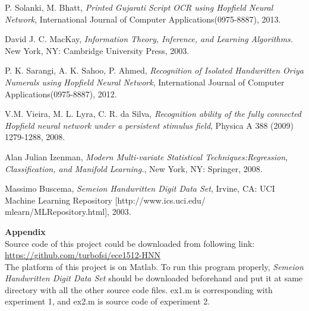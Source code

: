 \begin{thebibliography}{1}
P. Solanki, M. Bhatt, \emph{Printed Gujarati Script OCR using Hopfield Neural Network}, International Journal of Computer Applications(0975-8887), 2013.

David J. C. MacKay, \emph{Information Theory, Inference, and Learning Algorithms.} New York, NY: Cambridge University Press, 2003.

P. K. Sarangi, A. K. Sahoo, P. Ahmed, \emph{Recognition of Isolated Handwritten Oriya Numerals using Hopfield Neural Network}, International Journal of Computer Applications(0975-8887), 2012.

V.M. Vieira, M. L. Lyra, C. R. da Silva, \emph{Recognition ability of the fully connected Hopfield neural network under a persistent stimulus field}, Physica A 388 (2009) 1279-1288, 2008.

Alan Julian Izenman, \emph{Modern Multi-variate Statistical Techniques:Regression, Classification, and Manifold Learning.}, New York, NY: Springer, 2008.

Massimo Buscema, \emph{Semeion Handwritten Digit Data Set}, Irvine, CA: UCI Machine Learning Repository [http://www.ics.uci.edu/ mlearn/MLRepository.html], 2003.

\end{thebibliography}
\newpage
\huge \textbf{Appendix}\\

\normalsize Source code of this project could be downloaded from following link:\\

\underline{https://github.com/turbofsi/ece1512-HNN} \\

The platform of this project is on Matlab. To run this program properly, \textit{Semeion Handwritten Digit Data Set} should be downloaded beforehand and put it at same directory with all the other source code files. ex1.m is corresponding with experiment 1, and ex2.m is source code of experiment 2. 
